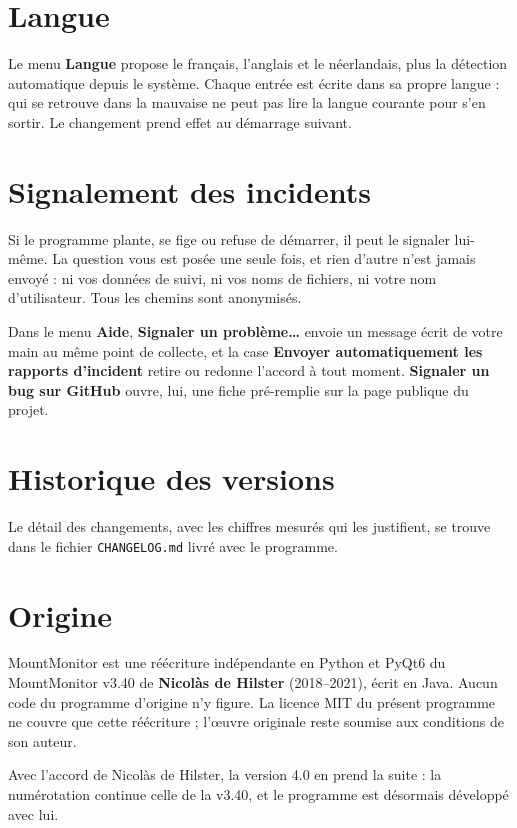 \section{Langue}

Le menu \textbf{Langue} propose le français, l'anglais et le néerlandais, plus
la détection automatique depuis le système. Chaque entrée est écrite dans sa
propre langue : qui se retrouve dans la mauvaise ne peut pas lire la langue
courante pour s'en sortir. Le changement prend effet au démarrage suivant.

\section{Signalement des incidents}

Si le programme plante, se fige ou refuse de démarrer, il peut le signaler
lui-même. La question vous est posée une seule fois, et rien d'autre n'est
jamais envoyé : ni vos données de suivi, ni vos noms de fichiers, ni votre nom
d'utilisateur. Tous les chemins sont anonymisés.

Dans le menu \textbf{Aide}, \textbf{Signaler un problème\ldots} envoie un
message écrit de votre main au même point de collecte, et la case
\textbf{Envoyer automatiquement les rapports d'incident} retire ou redonne
l'accord à tout moment. \textbf{Signaler un bug sur GitHub} ouvre, lui, une
fiche pré-remplie sur la page publique du projet.

\section{Historique des versions}

Le détail des changements, avec les chiffres mesurés qui les justifient, se
trouve dans le fichier \texttt{CHANGELOG.md} livré avec le programme.

\section{Origine}

MountMonitor est une réécriture indépendante en Python et PyQt6 du
MountMonitor v3.40 de \textbf{Nicolàs de Hilster} (2018--2021), écrit en Java.
Aucun code du programme d'origine n'y figure. La licence MIT du présent
programme ne couvre que cette réécriture ; l'\oe uvre originale reste soumise
aux conditions de son auteur.

Avec l'accord de Nicolàs de Hilster, la version 4.0 en prend la suite : la
numérotation continue celle de la v3.40, et le programme est désormais
développé avec lui.
